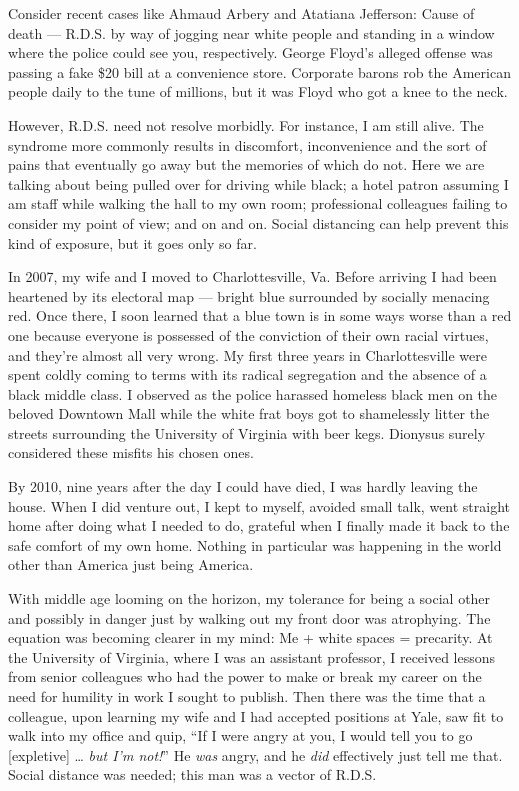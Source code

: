 Consider recent cases like Ahmaud Arbery and Atatiana Jefferson: Cause
of death --- R.D.S. by way of jogging near white people and standing in
a window where the police could see you, respectively. George Floyd's
alleged offense was passing a fake \$20 bill at a convenience store.
Corporate barons rob the American people daily to the tune of millions,
but it was Floyd who got a knee to the neck.

However, R.D.S. need not resolve morbidly. For instance, I am still
alive. The syndrome more commonly results in discomfort, inconvenience
and the sort of pains that eventually go away but the memories of which
do not. Here we are talking about being pulled over for driving while
black; a hotel patron assuming I am staff while walking the hall to my
own room; professional colleagues failing to consider my point of view;
and on and on. Social distancing can help prevent this kind of exposure,
but it goes only so far.

In 2007, my wife and I moved to Charlottesville, Va. Before arriving I
had been heartened by its electoral map --- bright blue surrounded by
socially menacing red. Once there, I soon learned that a blue town is in
some ways worse than a red one because everyone is possessed of the
conviction of their own racial virtues, and they're almost all very
wrong. My first three years in Charlottesville were spent coldly coming
to terms with its radical segregation and the absence of a black middle
class. I observed as the police harassed homeless black men on the
beloved Downtown Mall while the white frat boys got to shamelessly
litter the streets surrounding the University of Virginia with beer
kegs. Dionysus surely considered these misfits his chosen ones.

By 2010, nine years after the day I could have died, I was hardly
leaving the house. When I did venture out, I kept to myself, avoided
small talk, went straight home after doing what I needed to do, grateful
when I finally made it back to the safe comfort of my own home. Nothing
in particular was happening in the world other than America just being
America.

With middle age looming on the horizon, my tolerance for being a social
other and possibly in danger just by walking out my front door was
atrophying. The equation was becoming clearer in my mind: Me + white
spaces = precarity. At the University of Virginia, where I was an
assistant professor, I received lessons from senior colleagues who had
the power to make or break my career on the need for humility in work I
sought to publish. Then there was the time that a colleague, upon
learning my wife and I had accepted positions at Yale, saw fit to walk
into my office and quip, ``If I were angry at you, I would tell you to
go {[}expletive{]} \ldots{} \emph{but I'm not!}'' He \emph{was} angry,
and he \emph{did} effectively just tell me that. Social distance was
needed; this man was a vector of R.D.S.

